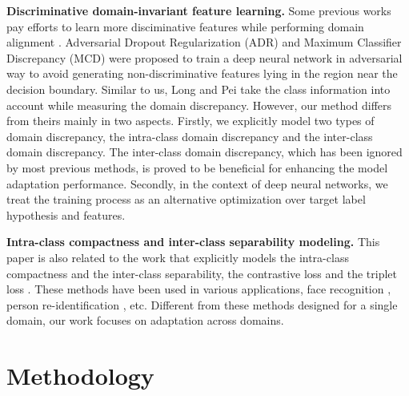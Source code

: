 \documentclass[10pt,twocolumn,letterpaper]{article}
\begin{document}
\noindent\textbf{Discriminative domain-invariant feature learning.}
Some previous works pay efforts to learn more disciminative features while 
performing domain alignment \cite{sener2016learning,haeusser2017associative,saito2017adversarial,saito2017maximum,pei2018multi,wang2018visual}.
Adversarial Dropout Regularization (ADR) \cite{saito2017adversarial} 
and Maximum Classifier Discrepancy (MCD) \cite{saito2017maximum} were proposed to train 
a deep neural network in adversarial way to avoid generating non-discriminative features lying in the region near the decision boundary.
Similar to us, Long \etal \cite{long2013transfer} and Pei \etal \cite{pei2018multi} take the class information into account while measuring the domain discrepancy. However, our method differs from theirs mainly in two aspects. 
Firstly, we explicitly model two types of domain discrepancy, \ie
the intra-class domain discrepancy and the inter-class domain discrepancy.
The inter-class domain discrepancy, which has been ignored by most previous methods,
is proved to be beneficial for enhancing 
the model adaptation performance.
Secondly, in the context of deep neural networks, 
we treat the training process as 
an alternative optimization over target label hypothesis and features.

\noindent\textbf{Intra-class compactness and inter-class separability modeling.}
This paper is also related to the work that explicitly models the intra-class compactness and the inter-class separability, \eg the contrastive loss \cite{hadsell2006dimensionality} and the triplet loss \cite{schroff2015facenet}. These methods have been used in various applications, 
\eg face recognition \cite{cheng2016person}, person re-identification \cite{hermans2017defense}, etc. Different from these methods designed for a single domain, our work focuses on adaptation across domains. 

















%
 
\section{Methodology}
\end{document}
